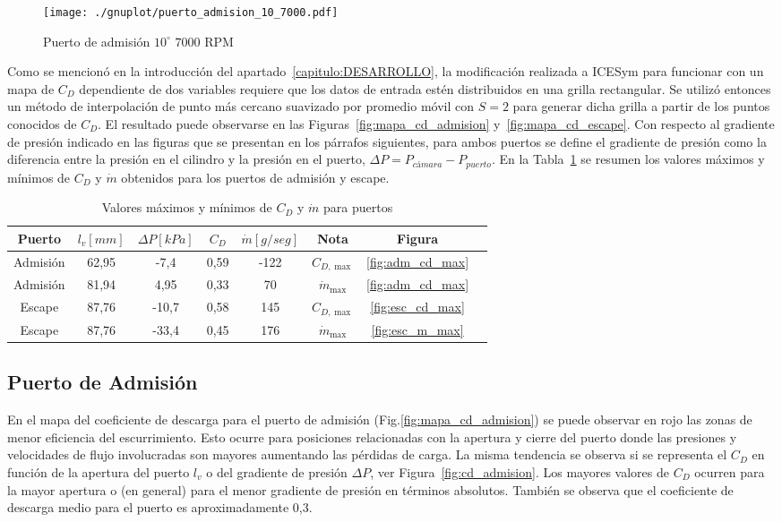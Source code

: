 \begin{figure}[h]
  \centering
  \texttt{[image: ./gnuplot/puerto\_admision\_10\_7000.pdf]}
  \caption{Puerto de admisión $10^{\circ}$ \@ $7000$ RPM}\label{fig:adm_10_7000rpm}
\end{figure}

Como se mencionó en la introducción del apartado~\ref{capitulo:DESARROLLO}, la
modificación realizada a ICESym para funcionar con un mapa de $C_{D}$
dependiente de dos variables requiere que los datos de entrada estén
distribuidos en una grilla rectangular.
%
Se utilizó entonces un método de interpolación de punto más cercano suavizado
por promedio móvil con $S=2$ para generar dicha grilla a partir de los puntos
conocidos de $C_{D}$.
%
El resultado puede observarse en las Figuras~\ref{fig:mapa_cd_admision}
y~\ref{fig:mapa_cd_escape}.
%
Con respecto al gradiente de presión indicado en las figuras que se presentan en
los párrafos siguientes, para ambos puertos se define el gradiente de presión
como la diferencia entre la presión en el cilindro y la presión en el puerto,
$\Delta P = P_{cámara} - P_{puerto}$.
%
En la Tabla~\ref{tab:resumen_puertos} se resumen los valores máximos y mínimos
de $C_{D}$ y $\dot{m}$ obtenidos para los puertos de admisión y escape.

\begin{table}[h]
  \centering
  \begin{tabular}{cccccccc}\toprule
    Puerto & $l_{v} [mm]$ & $\Delta P [kPa]$ & $C_{D}$ & $\dot{m} [g/seg]$ & Nota & Figura\\ \midrule
    Admisión & 62,95 &  -7,4 & 0,59  & -122 & $C_{D,\max}$ &\ref{fig:adm_cd_max} \\
    Admisión & 81,94 &  4,95 & 0,33 &   70 & $\dot{m}_{\max}$ &\ref{fig:adm_cd_max} \\
    Escape   & 87,76 & -10,7 & 0,58 &  145 & $C_{D,\max}$ &\ref{fig:esc_cd_max}\\
    Escape   & 87,76 & -33,4 & 0,45 &  176 & $\dot{m}_{\max}$ &\ref{fig:esc_m_max}\\
  \end{tabular}
  \caption{Valores máximos y mínimos de $C_{D}$ y $\dot{m}$ para puertos}\label{tab:resumen_puertos}
\end{table}


\subsection{Puerto de Admisión}
%
En el mapa del coeficiente de descarga  para el puerto de admisión
(Fig.\ref{fig:mapa_cd_admision}) se puede observar en rojo las zonas de menor
eficiencia del escurrimiento.
%
Esto ocurre para posiciones relacionadas con la apertura y cierre del puerto
donde las presiones y velocidades de flujo involucradas son mayores aumentando
las pérdidas de carga.
%
La misma tendencia se observa si se representa el $C_{D}$ en función de la
apertura del puerto $l_{v}$ o del gradiente de presión $\Delta P$, ver
Figura~\ref{fig:cd_admision}.
%
Los mayores valores de $C_{D}$ ocurren para la mayor apertura o (en general)
para el menor gradiente de presión en términos absolutos.
%
También se observa que el coeficiente de descarga medio para el puerto es
aproximadamente 0,3.


